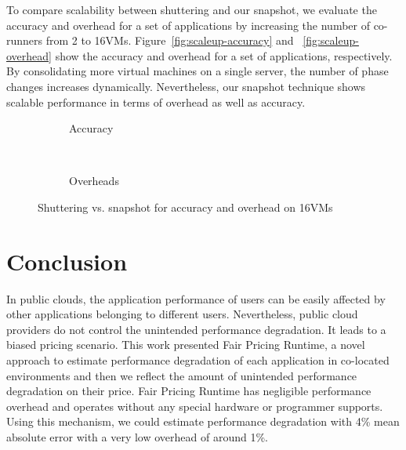 \documentclass{sig-alternate}
\begin{document}
To compare scalability between shuttering and our snapshot, we evaluate the accuracy and overhead for a set of applications by increasing the number of co-runners from 2 to 16VMs. Figure~\ref{fig:scaleup-accuracy} and ~\ref{fig:scaleup-overhead} show the accuracy and overhead for a set of applications, respectively. By consolidating more virtual machines on a single server, the number of phase changes increases dynamically. Nevertheless, our snapshot technique shows scalable performance in terms of overhead as well as accuracy.
\begin{figure*}
\centering
\begin{subfigure}[t]{2\columnwidth}
\centering
{}
\caption{Accuracy}
\label{fig:accuracy-comparison}
\end{subfigure}
\hfill\\
\begin{subfigure}[t]{2\columnwidth}
\centering
{}
\caption{Overheads}
\label{fig:overhead-comparison}
\end{subfigure}
\caption{Shuttering vs. snapshot for accuracy and overhead on 16VMs}
\label{fig:comparison}
\end{figure*}
\section{Conclusion}
\label{sec:Conclusion}

In public clouds, the application performance of users can be easily affected by other applications belonging to different users. 
Nevertheless, public cloud providers do not control the unintended performance degradation. It leads to a biased pricing scenario. 
This work presented Fair Pricing Runtime, a novel approach to estimate performance degradation of each application in co-located environments and then we reflect the amount of unintended performance degradation on their price. 
Fair Pricing Runtime has negligible performance overhead and operates without any special hardware or programmer supports. Using this mechanism, we could estimate performance degradation with 4\% mean absolute error with a very low overhead of around 1\%.


\end{document}
